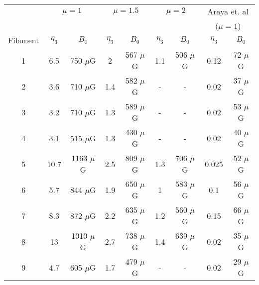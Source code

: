 
\begin{tabular}{@{}c c c c c c c c c@{}}
\toprule
  &\multicolumn{2}{c}{$\mu = 1$} & \multicolumn{2}{c}{$\mu = 1.5$} &
    \multicolumn{2}{c}{$\mu = 2$} & \multicolumn{2}{c}{Araya et. al} \\
  & & & & & &  &\multicolumn{2}{c}{($\mu = 1$)} \\
\cmidrule(l){2-3}
\cmidrule(l){4-5}
\cmidrule(l){6-7}
\cmidrule(l){8-9}
Filament &$\eta_{3}$ & $B_{0}$ &$\eta_{3}$ & $B_{0}$ & $\eta_{3}$ & $B_{0}$ &
    $\eta_{3}$ & $B_{0}$ \\
\cmidrule(l){2-9}
1 & 6.5  & 750 $\mu$G & 2 & 567 $\mu$G & 1.1 & 506 $\mu$G & 0.12 & 72 $\mu$G \\
2 & 3.6 & 710 $\mu$G & 1.4 & 582 $\mu$G & - & - & 0.02 & 37 $\mu$G\\
3 & 3.2 &  710 $\mu$G& 1.3 & 589 $\mu$G& - & - & 0.02 & 53 $\mu$G\\
4 & 3.1& 515 $\mu$G & 1.3 & 430 $\mu$G & -& - & 0.02 & 40 $\mu$G \\
5 & 10.7 & 1163 $\mu$G & 2.5 & 809 $\mu$G & 1.3&  706 $\mu$G & 0.025 & 52 $\mu$G \\
6 & 5.7 & 844 $\mu$G & 1.9 & 650 $\mu$G  & 1 & 583 $\mu$G & 0.1 & 56 $\mu$G \\
7 & 8.3 & 872 $\mu$G & 2.2 & 635 $\mu$G& 1.2 & 560 $\mu$G & 0.15 & 66 $\mu$G\\
8 & 13 & 1010 $\mu$G & 2.7 & 738 $\mu$G & 1.4 & 639 $\mu$G & 0.02 & 35 $\mu$G\\
9 & 4.7 & 605 $\mu$G & 1.7 & 479 $\mu$G & - & -& 0.02 & 29 $\mu$G\\
\bottomrule
\end{tabular}
